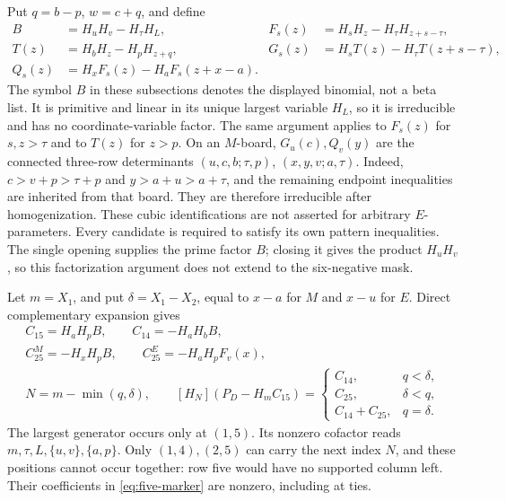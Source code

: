 \documentclass[11pt,a4paper]{amsart}
\numberwithin{equation}{section}
\theoremstyle{plain}
\theoremstyle{definition}
\begin{document}
Put \(q=b-p\), \(w=c+q\), and define
\[
 \begin{aligned}
 B&=H_uH_v-H_\tau H_L,&
 F_s(z)&=H_sH_z-H_\tau H_{z+s-\tau},\\
 T(z)&=H_bH_z-H_pH_{z+q},&
 G_s(z)&=H_sT(z)-H_\tau T(z+s-\tau),\\
 Q_s(z)&=H_xF_s(z)-H_aF_s(z+x-a).
 \end{aligned}
\]
The symbol \(B\) in these subsections denotes the displayed binomial,
not a beta list.  It is primitive and linear in its unique largest
variable \(H_L\), so it is irreducible and has no coordinate-variable
factor.  The same argument applies to \(F_s(z)\) for \(s,z>\tau\)
and to \(T(z)\) for \(z>p\).  On an \(M\)-board, \(G_u(c),Q_v(y)\)
are the connected three-row determinants
\((u,c,b;\tau,p)\), \((x,y,v;a,\tau)\).  Indeed,
\(c>v+p>\tau+p\) and \(y>a+u>a+\tau\), and the remaining
endpoint inequalities are inherited from that board.  They are therefore
irreducible after homogenization.  These cubic identifications are not
asserted for arbitrary \(E\)-parameters.  Every candidate is required to
satisfy its own pattern inequalities.  The single opening supplies the
prime factor \(B\); closing it gives the product \(H_uH_v\), so this
factorization argument does not extend to the six-negative mask.  

Let \(m=X_1\), and put \(\delta=X_1-X_2\), equal to \(x-a\) for
\(M\) and \(x-u\) for \(E\).  Direct complementary expansion gives
\begin{equation}\label{eq:five-marker}
 \begin{gathered}
 C_{15}=H_aH_pB,\qquad C_{14}=-H_aH_bB,\\
 C_{25}^{M}=-H_xH_pB,\qquad
 C_{25}^{E}=-H_aH_pF_v(x),\\
 N=m-\min(q,\delta),\qquad
 [H_N](P_D-H_mC_{15})=
 \begin{cases}
 C_{14},&q<\delta,\\
 C_{25},&\delta<q,\\
 C_{14}+C_{25},&q=\delta.
 \end{cases}
 \end{gathered}
\end{equation}
The largest generator occurs only at \((1,5)\).  Its nonzero cofactor
reads \(m,\tau,L,\{u,v\},\{a,p\}\).  Only \((1,4),(2,5)\) can
carry the next index \(N\), and these positions cannot occur together:
row five would have no supported column left.  Their coefficients in
\eqref{eq:five-marker} are nonzero, including at ties.  
\end{document}
